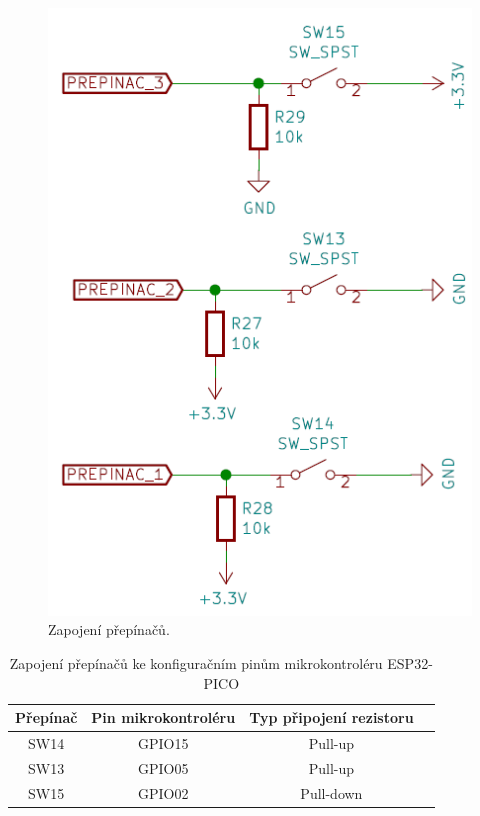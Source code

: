   \begin{figure}[!h]
    \begin{center}
      \includegraphics[scale=0.6]{obrazky/Prepinace_zapojeni.png}
    \end{center}
    \caption[Zapojení přepínačů]{Zapojení přepínačů.}
  \end{figure}

  \begin{table}[!h]
    \caption{Zapojení přepínačů ke konfiguračním pinům mikrokontroléru ESP32-PICO}
    \begin{center}
        \begin{tabular}{|c|c|c|c|}
            \hline
            {\bf Přepínač}   & {\bf Pin mikrokontroléru} & {\bf Typ připojení rezistoru} \\
            \hline
            SW14      & GPIO15 & Pull-up \\
            \hline
            SW13      & GPIO05 & Pull-up \\
            \hline
            SW15      & GPIO02 & Pull-down \\
            \hline
        \end{tabular}    
    \end{center}
  \end{table}

